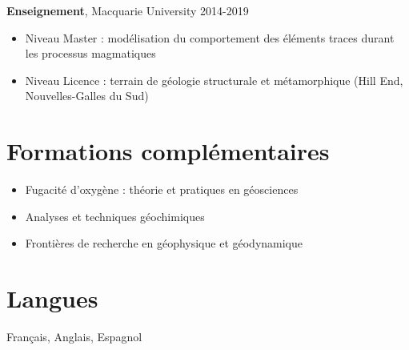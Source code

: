 \documentclass[a4paper,11pt]{article}
\begin{document}
\textbf{Enseignement}, Macquarie University
\hfill {2014-2019}
    \begin{itemize}[label={},itemsep=0pt,parsep=0pt]
        \item Niveau Master : modélisation du comportement des éléments traces durant les processus magmatiques 
        \item Niveau Licence : terrain de géologie structurale et métamorphique (Hill End, Nouvelles-Galles du Sud)
    \end{itemize}

\section{Formations complémentaires}

    \begin{itemize}[label={},itemsep=0pt,parsep=0pt]
        \item Fugacité d’oxygène : théorie et pratiques en géosciences
        \item Analyses et techniques géochimiques
        \item Frontières de recherche en géophysique et géodynamique
    \end{itemize}
    
\section{Langues}

Français, Anglais, Espagnol

\end{document}
